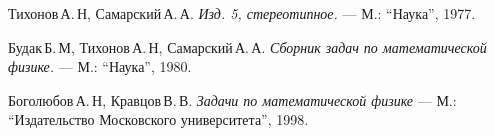 \begin{thebibliography}{99}
Тихонов\,А.\,Н, Самарский\,А.\,А.
{\itshape Изд. 5, стереотипное.} --- М.: \enquote{Наука}, 1977.

Будак\,Б.\,М, Тихонов\,А.\,Н, Самарский\,А.\,А.
{\itshape Сборник задач по математической физике.} --- М.: \enquote{Наука}, 1980.

Боголюбов\,А.\,Н, Кравцов\,В.\,В.
{\itshape Задачи по математической физике} --- М.: \enquote{Издательство Московского университета}, 1998.


\end{thebibliography}
\pagebreak


